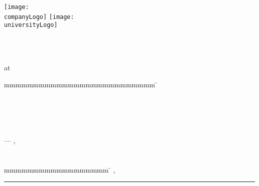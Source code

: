 \begin{titlepage}
	\texttt{[image: \\companyLogo]}
	\hfill
	\texttt{[image: \\universityLogo]}
	\centering
	
	{\large \ \par}
	{\scshape\LARGE \reportType \par}	
	\vspace{1.5cm}
	{\huge\bfseries \thesisTitle \par}
	\vspace{1.5cm}
	{\large \courseOfStudies \\ at \university \par}
	\vspace{1cm}
	{\large \byTitle \par}
	{\Large\itshape \authorName \par}
	\vfill
	{\large \thesisDate \par}
	\vfill
	\begin{tabbing}
		mmmmmmmmmmmmmmmmmmmmmmmmmm			\= \kill 			%
		\textbf{\timeOfProjectTitle}		\> \timeOfProject \\
		\textbf{\studentIdTitle}			\> \studentId \\
		\textbf{\companyTitle}				\> \company \\
		\textbf{\supervisorTitle}			\> \supervisorName \\
		\textbf{\secondSupervisorTitle}		\> \secondSupervisorName \\		
	\end{tabbing}
\end{titlepage}

\cleardoublepage
\begin{titlepage}
	\noindent
	\begin{minipage}[c][\textheight][c]{\textwidth}
		\centering	
		\textbf{\textit{\quoteText}} \linebreak
		--- \textsc{\quoteAuthor}, \ \textit{\quoteSource}
	\end{minipage}
\end{titlepage}

\cleardoublepage
\chapter*{\declarationTitle}
\declaration
\vspace{4em}

\begin{tabbing}
	mmmmmmmmmmmmmmmmmm	\= \kill 	%
	\city, \ \signatureDate 	\> \rule{6cm}{0.4pt} \\
				\> \authorName
\end{tabbing}

\cleardoublepage
\begin{otherlanguage}{ngerman} 
\begin{abstract}
	\abstractGermanText
\end{abstract}
\end{otherlanguage}

\cleardoublepage
\begin{abstract}
	\abstractText
\end{abstract}
\cleardoublepage
